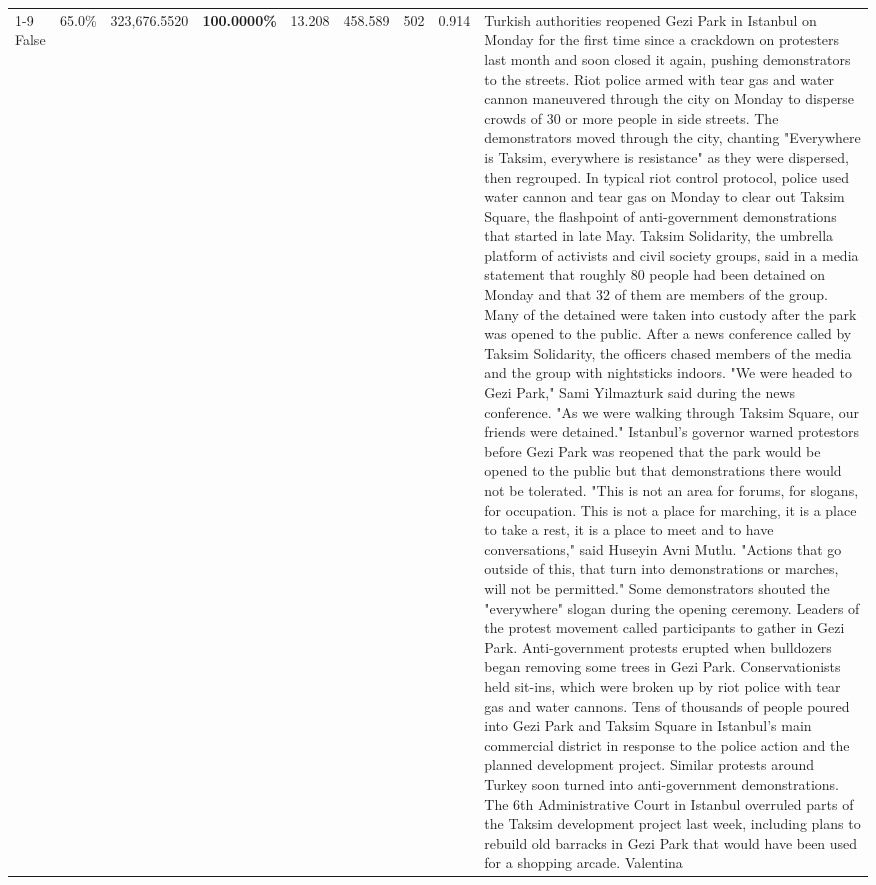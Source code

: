 \begin{table}[H]
\begin{tabular}{lllrlllll}
\cline{1-9}
False & 65.0\% & 323,676.5520 & \bfseries \color{red} 100.0000\% & 13.208 & 458.589 & 502 & 0.914 & Turkish authorities reopened Gezi Park in Istanbul on Monday for the first time since a crackdown on protesters last month and soon closed it again, pushing demonstrators to the streets. Riot police armed with tear gas and water cannon maneuvered through the city on Monday to disperse crowds of 30 or more people in side streets. The demonstrators moved through the city, chanting "Everywhere is Taksim, everywhere is resistance" as they were dispersed, then regrouped. In typical riot control protocol, police used water cannon and tear gas on Monday to clear out Taksim Square, the flashpoint of anti-government demonstrations that started in late May. Taksim Solidarity, the umbrella platform of activists and civil society groups, said in a media statement that roughly 80 people had been detained on Monday and that 32 of them are members of the group. Many of the detained were taken into custody after the park was opened to the public. After a news conference called by Taksim Solidarity, the officers chased members of the media and the group with nightsticks indoors. "We were headed to Gezi Park," Sami Yilmazturk said during the news conference. "As we were walking through Taksim Square, our friends were detained." Istanbul's governor warned protestors before Gezi Park was reopened that the park would be opened to the public but that demonstrations there would not be tolerated. "This is not an area for forums, for slogans, for occupation. This is not a place for marching, it is a place to take a rest, it is a place to meet and to have conversations," said Huseyin Avni Mutlu. "Actions that go outside of this, that turn into demonstrations or marches, will not be permitted." Some demonstrators shouted the "everywhere" slogan during the opening ceremony. Leaders of the protest movement called participants to gather in Gezi Park. Anti-government protests erupted when bulldozers began removing some trees in Gezi Park. Conservationists held sit-ins, which were broken up by riot police with tear gas and water cannons. Tens of thousands of people poured into Gezi Park and Taksim Square in Istanbul's main commercial district in response to the police action and the planned development project. Similar protests around Turkey soon turned into anti-government demonstrations. The 6th Administrative Court in Istanbul overruled parts of the Taksim development project last week, including plans to rebuild old barracks in Gezi Park that would have been used for a shopping arcade. Valentina \\

\end{tabular}
\end{table}
